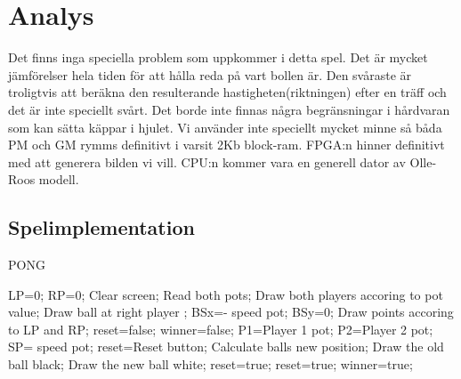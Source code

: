 \section{Analys}
Det finns inga speciella problem som uppkommer i detta spel. Det är mycket jämförelser hela tiden för att hålla reda på vart bollen är. Den svåraste är troligtvis att beräkna den resulterande hastigheten(riktningen) efter en träff och det är inte speciellt svårt.
\newline
\newline
Det borde inte finnas några begränsningar i hårdvaran som kan sätta käppar i hjulet. Vi använder inte speciellt mycket minne så båda PM och GM rymms definitivt i varsit 2Kb block-ram. FPGA:n hinner definitivt med att generera bilden vi vill. CPU:n kommer vara en generell dator av Olle-Roos modell.
\subsection{Spelimplementation}

\begin{algorithm}[H]
\caption{PONG}
\label{alg:PONG}
\begin{algorithmic}
\State LP=0;
\State RP=0;
\EndIf
\State Clear screen;
\State Read both pots;
\State Draw both players accoring to pot value;
\State Draw ball at right player ;
\State BSx=- speed pot;
\State BSy=0;
\State Draw points accoring to LP and RP;
\State reset=false;
\State winner=false;
	\State P1=Player 1 pot;
	\State P2=Player 2 pot;
	\State SP= speed pot;
	\State reset=Reset button;
	\State Calculate balls new position;
	\State Draw the old ball black;
	\State Draw the new ball white;
\EndIf
\EndIf
		\State reset=true;
\EndIf
		\State reset=true;
\EndIf
		\State winner=true;
\EndIf

	
\EndWhile
\EndWhile
\EndProcedure
\end{algorithmic}
\end{algorithm}



